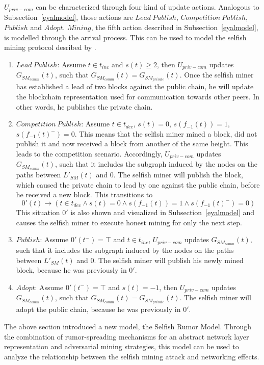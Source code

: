 $U_{priv-com}$ can be characterized through four kind of update actions. Analogous to Subsection~\ref{eyalmodel}, those actions are $Lead~Publish$, $Competition~Publish$, $Publish$ and $Adopt$. $Mining$, the fifth action described in Subsection~\ref{eyalmodel}, is modelled through the arrival process.
This can be used to model the selfish mining protocol desribed by \citeauthor{eyal}.
\begin{enumerate}
\item $Lead~Publish$: Assume $t \in t_{inc}$ and $s(t) \geq 2$, then $U_{priv-com}$ updates $G_{SM_{comm}}(t)$, such that $G_{SM_{comm}}(t) = G_{SM_{private}}(t)$. Once the selfish miner has established a lead of two blocks against the public chain, he will update the blockchain representation used for communication towards other peers. In other words, he publishes the private chain.
\item $Competition~Publish$: Assume $t \in t_{dec}$, $s(t) = 0$, $s(f_{-1}(t)) = 1$, $s(f_{-1}(t)^-) = 0$. This means that the selfish miner mined a block, did not publish it and now received a block from another of the same height. This leads to the competition scenario. Accordingly, $U_{priv-com}$ updates $G_{SM_{comm}}(t)$, such that it includes the subgraph induced by the nodes on the paths between $L'_{SM}(t)$ and ${0}$. The selfish miner will publish the block, which caused the private chain to lead by one against the public chain, before he received a new block. This transitions to 
\begin{equation}
0'(t) \rightarrow \left( t \in t_{dec} \wedge s(t) = 0 \wedge s(f_{-1}(t)) = 1 \wedge s(f_{-1}(t)^-) = 0\right)
\end{equation}
This situation $0'$ is also shown and visualized in Subsection~\ref{eyalmodel} and causes the selfish miner to execute honest mining for only the next step. \label{comppub}
\item $Publish$: Assume $0'(t^-)=\top$ and $t \in t_{inc}$, $U_{priv-com}$ updates $G_{SM_{comm}}(t)$, such that it includes the subgraph induced by the nodes on the paths between $L'_{SM}(t)$ and ${0}$. The selfish miner will publish his newly mined block, because he was previously in $0'$.
\item $Adopt$: Assume $0'(t^-)=\top$ and $s(t)=-1$, then $U_{priv-com}$ updates $G_{SM_{comm}}(t)$, such that $G_{SM_{comm}}(t) = G_{SM_{private}}(t)$. The selfish miner will adopt the public chain, because he was previously in $0'$.
\end{enumerate}
The above section introduced a new model, the Selfish Rumor Model. Through the combination of rumor-spreading mechanisms for an abstract network layer representation and adversarial mining strategies, this model can be used to analyze the relationship between the selfish mining attack and networking effects.




